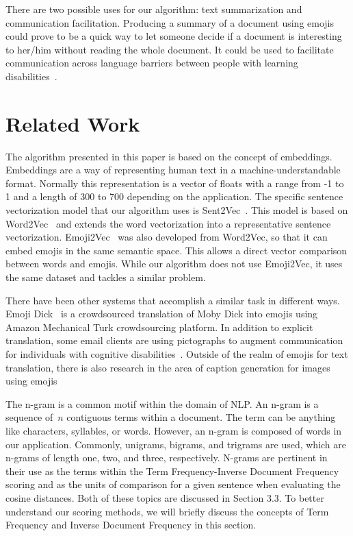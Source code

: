 \documentclass{article}[10]
\begin{document}
There are two possible uses for our algorithm: text summarization and communication facilitation. Producing a summary of a document using emojis could prove to be a quick way to let someone decide if a document is interesting to her/him without reading the whole document. It could be used to facilitate communication across language barriers between people with learning disabilities~\cite{vandeghinste2017translating}.

\section{Related Work}

The algorithm presented in this paper is based on the concept of embeddings\cite{WhatAreW70}. Embeddings are a way of representing human text in a machine-understandable format. Normally this representation is a vector of floats with a range from -1 to 1 and a length of 300 to 700 depending on the application. The specific sentence vectorization model that our algorithm uses is Sent2Vec~\cite{pg2017unsu}. This model is based on Word2Vec~\cite{mikolov2013efficient} and extends the word vectorization into a representative sentence vectorization. Emoji2Vec~\cite{Eisner_2016} was also developed from Word2Vec, so that it can embed emojis in the same semantic space. This allows a direct vector comparison between words and emojis. While our algorithm does not use Emoji2Vec, it uses the same dataset and tackles a similar problem.

There have been other systems that accomplish a similar task in different ways. Emoji Dick~\cite{radford2016telephone} is a crowdsourced translation of Moby Dick into emojis using Amazon Mechanical Turk crowdsourcing platform. In addition to explicit translation, some email clients are using pictographs to augment communication for individuals with cognitive disabilities~\cite{vandeghinste2017translating}. Outside of the realm of emojis for text translation, there is also research in the area of caption generation for images using emojis~\cite{mazoure-etal-2018-emojigan,cappallo2015image2emoji}

The n-gram is a common motif within the domain of NLP\@. An n-gram is a sequence of~\(n\) contiguous terms within a document. The term can be anything like characters, syllables, or words. However, an n-gram is composed of words in our application. Commonly, unigrams, bigrams, and trigrams are used, which are n-grams of length one, two, and three, respectively. N-grams are pertinent in their use as the terms within the Term Frequency-Inverse Document Frequency scoring and as the units of comparison for a given sentence when evaluating the cosine distances. Both of these topics are discussed in Section 3.3. To better understand our scoring methods, we will briefly discuss the concepts of Term Frequency and Inverse Document Frequency in this section.
\end{document}
